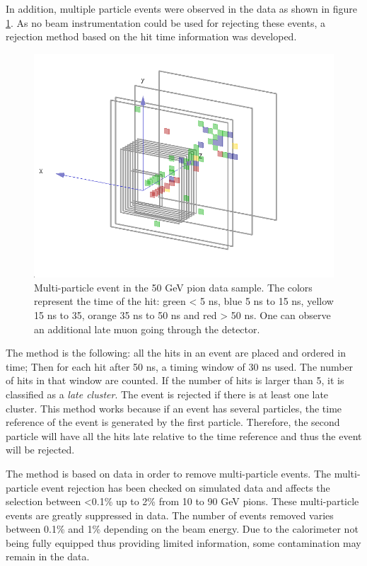 In addition, multiple particle events were observed in the data as shown in figure \ref{fig:DoubleParticleEvent}. As no beam instrumentation could be used for rejecting these events, a rejection method based on the hit time information was developed.

\begin{figure}[htbp!]
	\centering
	\includegraphics[width=0.7\linewidth]{chap5/fig_AHCAL_timing/Pions/DoubleParticleEventPions.png}
	\caption{Multi-particle event in the 50 GeV pion data sample. The colors represent the time of the hit: green < 5 ns, blue 5 ns to 15 ns, yellow 15 ns to 35, orange 35 ns to 50 ns and red > 50 ns. One can observe an additional late muon going through the detector.} \label{fig:DoubleParticleEvent}
\end{figure}

The method is the following: all the hits in an event are placed and ordered in time; Then for each hit after 50 ns, a timing window of 30 ns used. The number of hits in that window are counted. If the number of hits is larger than 5, it is classified as a \textit{late cluster}. The event is rejected if there is at least one late cluster. This method works because if an event has several particles, the time reference of the event is generated by the first particle. Therefore, the second particle will have all the hits late relative to the time reference and thus the event will be rejected.

The method is based on data in order to remove multi-particle events. The multi-particle event rejection has been checked on simulated data and affects the selection between <0.1\% up to 2\% from 10 to 90 GeV pions. These multi-particle events are greatly suppressed in data. The number of events removed varies between 0.1\% and 1\% depending on the beam energy. Due to the calorimeter not being fully equipped thus providing limited information, some contamination may remain in the data.

